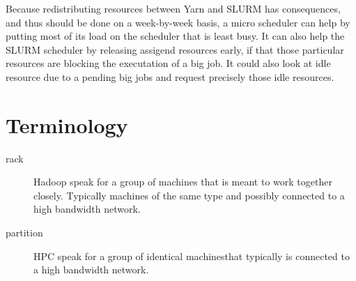 \documentclass{article}
\begin{document}
Because redistributing resources between Yarn and SLURM has consequences,
and thus should be done on a week-by-week basis, a micro scheduler can help
by putting most of its load on the scheduler that is least busy. It can also
help the SLURM scheduler by releasing assigend resources early, if that
those particular resources are blocking the executation of a big job.
It could also look at idle resource due to a pending big jobs and request
precisely those idle resources.

\appendix

\section{Terminology}

\begin{description}
\item[rack] Hadoop speak for a group of machines that is meant to work together closely.
Typically machines of the same type and possibly connected to a high bandwidth network.
\item[partition] HPC speak for a group of identical machinesthat typically is connected
to a high bandwidth network.
\end{description}
\end{document}
